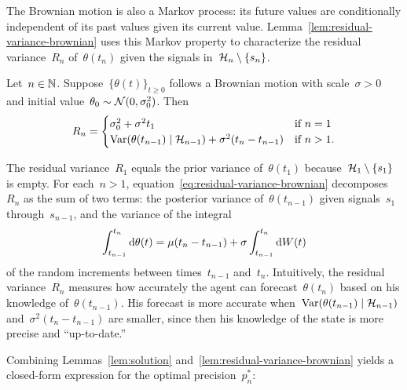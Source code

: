 \documentclass[11pt,oneside]{article}
\begin{document}
The Brownian motion is also a Markov process: its future values are conditionally independent of its past values given its current value.
Lemma~\ref{lem:residual-variance-brownian} uses this Markov property to characterize the residual variance~$R_n$ of~$\theta(t_n)$ given the signals in~$\mathcal{H}_n\setminus\{s_n\}$.

\begin{lemma}
    \label{lem:residual-variance-brownian}
    Let~$n\in\mathbb{N}$.
    Suppose~$\{\theta(t)\}_{t\ge0}$ follows a Brownian motion with scale~$\sigma>0$ and initial value~$\theta_0\sim\mathcal{N}(0,\sigma_0^2)$.
    Then
    \begin{equation}
        R_n=\begin{cases}
            \sigma_0^2+\sigma^2t_1 & \text{if}\ n=1 \\
            \operatorname{Var}(\theta(t_{n-1})\mid\mathcal{H}_{n-1})+\sigma^2(t_n-t_{n-1}) & \text{if}\ n>1.
        \end{cases} \label{eq:residual-variance-brownian}
    \end{equation}
\end{lemma}
%

The residual variance~$R_1$ equals the prior variance of~$\theta(t_1)$ because~$\mathcal{H}_1\setminus\{s_1\}$ is empty.
For each~$n>1$, equation~\eqref{eq:residual-variance-brownian} decomposes~$R_n$ as the sum of two terms:
the posterior variance of~$\theta(t_{n-1})$ given signals~$s_1$ through~$s_{n-1}$, and
the variance of the integral
\[ \int_{t_{n-1}}^{t_n}\mathrm{d}\theta(t)=\mu(t_n-t_{n-1})+\sigma\int_{t_{n-1}}^{t_n}\mathrm{d} W(t) \]
of the random increments between times~$t_{n-1}$ and~$t_n$.
Intuitively, the residual variance~$R_n$ measures how accurately the agent can forecast~$\theta(t_n)$ based on his knowledge of~$\theta(t_{n-1})$.
His forecast is more accurate when~$\operatorname{Var}(\theta(t_{n-1})\mid\mathcal{H}_{n-1})$ and~$\sigma^2(t_n-t_{n-1})$ are smaller, since then his knowledge of the state is more precise and ``up-to-date.''

Combining Lemmas~\ref{lem:solution} and~\ref{lem:residual-variance-brownian} yields a closed-form expression for the optimal precision~$p_n^*$:
\end{document}
